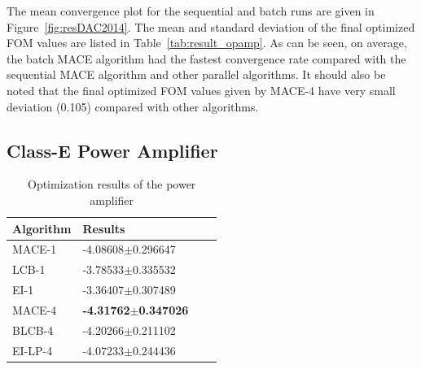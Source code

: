 The mean convergence plot for the sequential and batch runs are given in
Figure~\ref{fig:resDAC2014}. The mean and standard deviation of the final
optimized FOM values are listed in Table~\ref{tab:result_opamp}. As can be
seen, on average, the batch MACE algorithm had the fastest convergence rate
compared with the sequential MACE algorithm and other parallel algorithms. It
should also be noted that the final optimized FOM values given by MACE-4 have
very small deviation (0.105) compared with other algorithms.



\subsection{Class-E Power Amplifier}

\begin{table}[]
    \centering
    \caption{Optimization results of the power amplifier}
    \label{tab:result_PA}
    \begin{tabular}{llll}
        \toprule
        Algorithm & Results               \\ \midrule
        MACE-1    & -4.08608$\pm$0.296647 \\
        LCB-1     & -3.78533$\pm$0.335532 \\
        EI-1      & -3.36407$\pm$0.307489 \\
        MACE-4    & \textbf{-4.31762$\pm$0.347026} \\
        BLCB-4    & -4.20266$\pm$0.211102 \\
        EI-LP-4   & -4.07233$\pm$0.244436 \\
        \bottomrule
    \end{tabular}
    \vskip -0.2in
\end{table}



